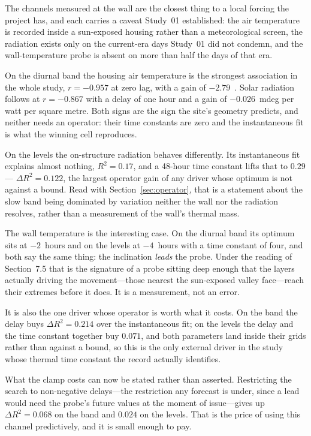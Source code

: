 \documentclass[11pt,a4paper]{article}
\begin{document}
The channels measured at the wall are the closest thing to a local forcing the
project has, and each carries a caveat Study~01 established: the air temperature
is recorded inside a sun-exposed housing rather than a meteorological screen,
the radiation exists only on the current-era days Study~01 did not condemn, and
the wall-temperature probe is absent on more than half the days of that era.

On the diurnal band the housing air temperature is the strongest association in
the whole study, $r = -0.957$ at zero lag, with a gain of
$-2.79$~\mdegC. Solar radiation follows at $r = -0.867$ with a delay of one hour
and a gain of $-0.026$~mdeg per watt per square metre. Both signs are the sign the
site's geometry predicts, and neither needs an operator: their time constants
are zero and the instantaneous fit is what the winning cell reproduces.

On the levels the on-structure radiation behaves differently. Its instantaneous
fit explains almost nothing, $R^2 = 0.17$, and a 48-hour time constant lifts that
to $0.29$ --- $\Delta R^2 = 0.122$, the largest operator gain of any driver whose
optimum is not against a bound. Read with Section~\ref{sec:operator}, that is a
statement about the slow band being dominated by variation neither the wall nor
the radiation resolves, rather than a measurement of the wall's thermal mass.

The wall temperature is the interesting case. On the diurnal band its optimum
sits at $-2$~hours and on the levels at $-4$~hours with a time constant of four,
and both say the same thing: the inclination \emph{leads} the probe. Under the
reading of Section~7.5 that is the signature of a probe sitting deep enough that
the layers actually driving the movement---those nearest the sun-exposed valley
face---reach their extremes before it does. It is a measurement, not an error.

It is also the one driver whose operator is worth what it costs. On the band the
delay buys $\Delta R^2 = 0.214$ over the instantaneous fit; on the levels the
delay and the time constant together buy $0.071$, and both parameters land
inside their grids rather than against a bound, so this is the only external
driver in the study whose thermal time constant the record actually identifies.

What the clamp costs can now be stated rather than asserted. Restricting the
search to non-negative delays---the restriction any forecast is under, since a
lead would need the probe's future values at the moment of issue---gives up
$\Delta R^2 = 0.068$ on the band and $0.024$ on the levels. That is the price of
using this channel predictively, and it is small enough to pay.
\end{document}
